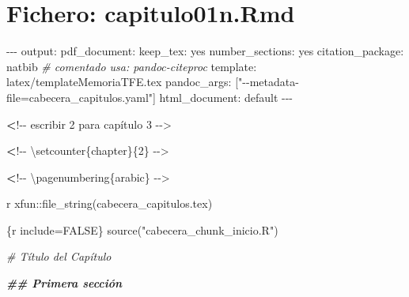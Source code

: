 \documentclass[11pt,a4paper,oneside,]{article}
\newenvironment{Shaded}{\begin{snugshade}}{\end{snugshade}}
\newcommand{\AttributeTok}[1]{\textcolor[rgb]{0.77,0.63,0.00}{#1}}
\newcommand{\CommentTok}[1]{\textcolor[rgb]{0.56,0.35,0.01}{\textit{#1}}}
\newcommand{\DecValTok}[1]{\textcolor[rgb]{0.00,0.00,0.81}{#1}}
\newcommand{\DocumentationTok}[1]{\textcolor[rgb]{0.56,0.35,0.01}{\textbf{\textit{#1}}}}
\newcommand{\ErrorTok}[1]{\textcolor[rgb]{0.64,0.00,0.00}{\textbf{#1}}}
\newcommand{\NormalTok}[1]{#1}
\newcommand{\OtherTok}[1]{\textcolor[rgb]{0.56,0.35,0.01}{#1}}
\newcommand{\SpecialCharTok}[1]{\textcolor[rgb]{0.00,0.00,0.00}{#1}}
\newcommand{\StringTok}[1]{\textcolor[rgb]{0.31,0.60,0.02}{#1}}
\numberwithin{dummy}{section}
\theoremstyle{ocrenumbox}
\theoremstyle{blacknumex}
\theoremstyle{blacknumbox}
\theoremstyle{ocrenum}
\theoremstyle{ocrenum}
\begin{document}
\newpage

\hypertarget{fichero-capitulo01n.rmd}{%
\section{Fichero: capitulo01n.Rmd}\label{fichero-capitulo01n.rmd}}

\begin{Shaded}
\begin{Highlighting}[numbers=left,,]
\SpecialCharTok{{-}{-}{-}}
\NormalTok{output}\SpecialCharTok{:}
\NormalTok{  pdf\_document}\SpecialCharTok{:}
\NormalTok{    keep\_tex}\SpecialCharTok{:}\NormalTok{ yes}
\NormalTok{    number\_sections}\SpecialCharTok{:}\NormalTok{ yes}
\NormalTok{    citation\_package}\SpecialCharTok{:}\NormalTok{ natbib  }\CommentTok{\# comentado usa: pandoc{-}citeproc}
\NormalTok{    template}\SpecialCharTok{:}\NormalTok{ latex}\SpecialCharTok{/}\NormalTok{templateMemoriaTFE.tex}
\NormalTok{    pandoc\_args}\SpecialCharTok{:}\NormalTok{ [}\StringTok{"{-}{-}metadata{-}file=cabecera\_capitulos.yaml"}\NormalTok{]}
\NormalTok{  html\_document}\SpecialCharTok{:}\NormalTok{ default}
\SpecialCharTok{{-}{-}{-}}

\ErrorTok{\textless{}}\SpecialCharTok{!{-}{-}}\NormalTok{ escribir }\DecValTok{2}\NormalTok{ para capítulo }\DecValTok{3} \SpecialCharTok{{-}}\OtherTok{{-}\textgreater{}}

\ErrorTok{\textless{}}\SpecialCharTok{!{-}{-}}\NormalTok{ \textbackslash{}setcounter\{chapter\}\{}\DecValTok{2}\NormalTok{\} }\SpecialCharTok{{-}}\OtherTok{{-}\textgreater{}}

\ErrorTok{\textless{}}\SpecialCharTok{!{-}{-}}\NormalTok{ \textbackslash{}pagenumbering\{arabic\} }\SpecialCharTok{{-}}\OtherTok{{-}\textgreater{}}

\StringTok{\textasciigrave{}}\AttributeTok{r xfun::file\_string(\textquotesingle{}cabecera\_capitulos.tex\textquotesingle{})}\StringTok{\textasciigrave{}}

\StringTok{\textasciigrave{}\textasciigrave{}\textasciigrave{}}\AttributeTok{\{r include=FALSE\}}
\AttributeTok{source("cabecera\_chunk\_inicio.R")}
\StringTok{\textasciigrave{}\textasciigrave{}\textasciigrave{}}

\CommentTok{\# Título del Capítulo}

\DocumentationTok{\#\# Primera sección}
\end{Highlighting}
\end{Shaded}

\newpage
\end{document}
